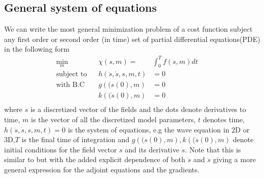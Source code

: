 \documentclass[fleqn,11pt]{SelfArx} %
\theoremstyle{definition}
\begin{document}
\subsection{General system of equations}
\label{sec:general_system}
We can write the most general minimization problem of a cost function subject any first order or second order (in time) set of partial differential equations(PDE) in the following form
\begin{equation}
\label{eq:general_system}
\begin{aligned}
\underset{m}{\text{min}} &&  \chi\left(s,m\right) = &  \int_0^T f\left(s,m\right) dt & &\\
\text{subject to} & & h\left(\ddot{s}, \dot{s}, s, m, t\right) & =  0 \\
 \text{with B.C} & & g\left((s\left(0\right), m\right) & = 0 \\
 & & k\left((\dot{s}\left(0\right), m\right) & = 0 \\
\end{aligned}
\end{equation}
where $s$ is a discretized vector of the fields and the dots denote derivatives to time, $m$ is the vector of all the discretized model parameters, $t$ denotes time, $h\left(\ddot{s}, \dot{s}, s, m, t\right)  =  0$ is the system of equations, e.g the wave equation in 2D or 3D,$T$ is the final time of integration and $g\left((s\left(0\right), m\right), k\left((\dot{s}\left(0\right), m\right)$ denote initial conditions for the field vector $s$ and its derivative $\dot{s}$. Note that this is similar to \cite{Bradley2012} but with the added explicit dependence of both $\dot s$ and $\ddot s$ giving a more general expression for the adjoint equations and the gradients. 
\end{document}
